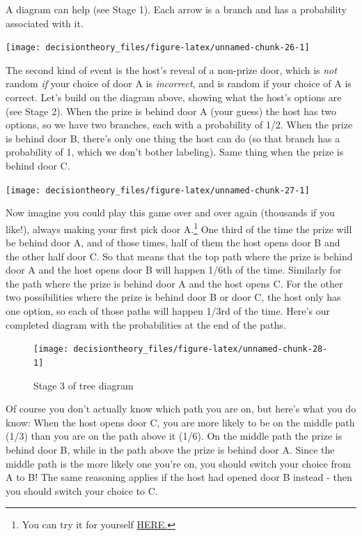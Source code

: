 \documentclass[]{tufte-book}
\begin{document}
A diagram can help (see Stage 1). Each arrow is a branch and has a probability associated with it.

\begin{marginfigure}
\texttt{[image: decisiontheory\_files/figure-latex/unnamed-chunk-26-1]} \caption[Stage 1 of tree diagram]{Stage 1 of tree diagram}\label{fig:unnamed-chunk-26}
\end{marginfigure}

The second kind of event is the host's reveal of a non-prize door, which is \emph{not} random \emph{if} your choice of door A is \emph{incorrect}, and is random if your choice of A is correct. Let's build on the diagram above, showing what the host's options are (see Stage 2). When the prize is behind door A (your guess) the host has two options, so we have two branches, each with a probability of 1/2. When the prize is behind door B, there's only one thing the host can do (so that branch has a probability of 1, which we don't bother labeling). Same thing when the prize is behind door C.

\begin{marginfigure}
\texttt{[image: decisiontheory\_files/figure-latex/unnamed-chunk-27-1]} \caption[Stage 2 of tree diagram]{Stage 2 of tree diagram}\label{fig:unnamed-chunk-27}
\end{marginfigure}

Now imagine you could play this game over and over again (thousands if you like!), always making your first pick door A.\footnote{You can try it for yourself \href{http://www.rossmanchance.com/applets/2021/montyhall/Monty.html}{HERE.}} One third of the time the prize will be behind door A, and of those times, half of them the host opens door B and the other half door C. So that means that the top path where the prize is behind door A and the host opens door B will happen 1/6th of the time. Similarly for the path where the prize is behind door A and the host opens C. For the other two possibilities where the prize is behind door B or door C, the host only has one option, so each of those paths will happen 1/3rd of the time. Here's our completed diagram with the probabilities at the end of the paths.

\begin{figure}
\texttt{[image: decisiontheory\_files/figure-latex/unnamed-chunk-28-1]} \caption[Stage 3 of tree diagram]{Stage 3 of tree diagram}\label{fig:unnamed-chunk-28}
\end{figure}

Of course you don't actually know which path you are on, but here's what you do know: When the host opens door C, you are more likely to be on the middle path (1/3) than you are on the path above it (1/6). On the middle path the prize is behind door B, while in the path above the prize is behind door A. Since the middle path is the more likely one you're on, you should switch your choice from A to B! The same reasoning applies if the host had opened door B instead - then you should switch your choice to C.
\end{document}
